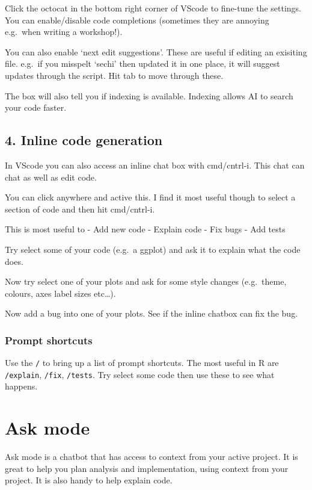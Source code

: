 \documentclass[
  letterpaper,
  DIV=11,
  numbers=noendperiod]{scrreprt}
\begin{document}
Click the octocat in the bottom right corner of VScode to fine-tune the
settings. You can enable/disable code completions (sometimes they are
annoying e.g.~when writing a workshop!).

You can also enable `next edit suggestions'. These are useful if editing
an exisiting file. e.g.~if you misspelt `sechi' then updated it in one
place, it will suggest updates through the script. Hit tab to move
through these.

The box will also tell you if indexing is available. Indexing allows AI
to search your code faster.

\subsection{4. Inline code generation}\label{inline-code-generation}

In VScode you can also access an inline chat box with cmd/cntrl-i. This
chat can chat as well as edit code.

You can click anywhere and active this. I find it most useful though to
select a section of code and then hit cmd/cntrl-i.

This is most useful to - Add new code - Explain code - Fix bugs - Add
tests

Try select some of your code (e.g.~a ggplot) and ask it to explain what
the code does.

Now try select one of your plots and ask for some style changes
(e.g.~theme, colours, axes label sizes etc\ldots).

Now add a bug into one of your plots. See if the inline chatbox can fix
the bug.

\subsubsection{Prompt shortcuts}\label{prompt-shortcuts}

Use the \texttt{/} to bring up a list of prompt shortcuts. The most
useful in R are \texttt{/explain}, \texttt{/fix}, \texttt{/tests}. Try
select some code then use these to see what happens.

\section{Ask mode}\label{ask-mode}

Ask mode is a chatbot that has access to context from your active
project. It is great to help you plan analysis and implementation, using
context from your project. It is also handy to help explain code.
\end{document}
